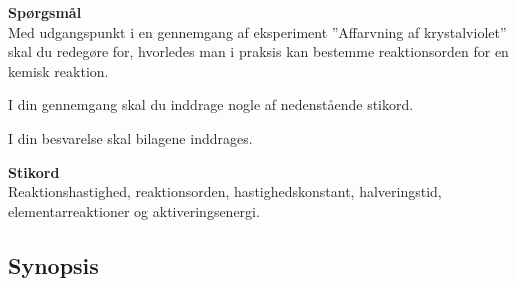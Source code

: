 \textbf{Spørgsmål}\\
Med udgangspunkt i en gennemgang af eksperiment ”Affarvning af krystalviolet” skal du redegøre for, hvorledes man i praksis kan bestemme reaktionsorden for en kemisk reaktion. 

I din gennemgang skal du inddrage nogle af nedenstående stikord. 

I din besvarelse skal bilagene inddrages.

\vspace{0.5 cm}
\textbf{Stikord}\\
Reaktionshastighed, reaktionsorden, hastighedskonstant, halveringstid, elementarreaktioner og aktiveringsenergi.

\subsection*{Synopsis}
